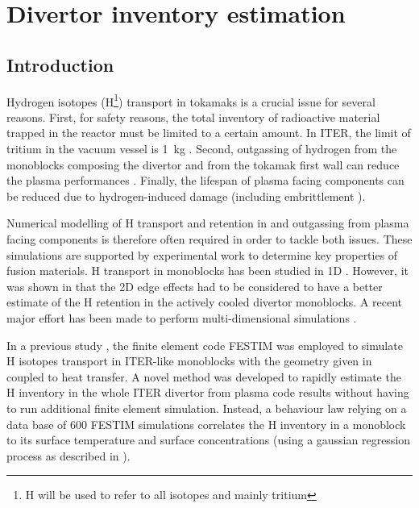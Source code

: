 \setchapterpreamble[u]{\margintoc}
\chapter{Divertor inventory estimation}
\section{Introduction}
Hydrogen isotopes (H\footnote{H will be used to refer to all isotopes and mainly tritium}) transport in tokamaks is a crucial issue for several reasons.
First, for safety reasons, the total inventory of radioactive material trapped in the reactor must be limited to a certain amount.
In ITER, the limit of tritium in the vacuum vessel is \SI{1}{kg} .
Second, outgassing of hydrogen from the monoblocks composing the divertor and from the tokamak first wall can reduce the plasma performances .
Finally, the lifespan of plasma facing components can be reduced due to hydrogen-induced damage (including embrittlement ).

Numerical modelling of H transport and retention in and outgassing from plasma facing components  is therefore often required in order to tackle both issues. 
These simulations are supported by experimental work to determine key properties of fusion materials.
H transport in monoblocks has been studied in 1D .
However, it was shown in  that the 2D edge effects had to be considered to have a better estimate of the H retention in the actively cooled divertor monoblocks.
A recent major effort has been made to perform multi-dimensional simulations \cite{delaporte-mathurin_finite_2019, delaporte-mathurin_parametric_2020, delaporte-mathurin_influence_2021, benannoune_multidimensional_2020}.

In a previous study \cite{delaporte-mathurin_parametric_2020}, the finite element code FESTIM  was employed to simulate H isotopes transport in ITER-like monoblocks with the geometry given in  coupled to heat transfer.
A novel method was developed to rapidly estimate the H inventory in the whole ITER divertor from plasma code results without having to run additional finite element simulation. Instead, a behaviour law relying on a data base of 600 FESTIM simulations correlates the H inventory in a monoblock to its surface temperature and surface concentrations (using a gaussian regression process as described in ).

